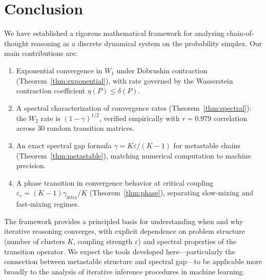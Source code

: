 \section{Conclusion}\label{sec:conclusion}

We have established a rigorous mathematical framework for analyzing
chain-of-thought reasoning as a discrete dynamical system on the probability
simplex. Our main contributions are:

\begin{enumerate}[label=(\arabic*)]
\item Exponential convergence in $W_1$ under Dobrushin contraction
  (Theorem~\ref{thm:exponential}), with rate governed by the Wasserstein
  contraction coefficient $\eta(P) \le \delta(P)$.

\item A spectral characterization of convergence rates
  (Theorem~\ref{thm:spectral}): the $W_2$ rate is $(1 - \gamma)^{1/2}$,
  verified empirically with $r = 0.979$ correlation across 30 random
  transition matrices.

\item An exact spectral gap formula $\gamma = K\varepsilon/(K-1)$ for
  metastable chains (Theorem~\ref{thm:metastable}), matching numerical
  computation to machine precision.

\item A phase transition in convergence behavior at critical coupling
  $\varepsilon_c = (K-1)\gamma_{\mathrm{intra}}/K$
  (Theorem~\ref{thm:phase}), separating slow-mixing and fast-mixing
  regimes.
\end{enumerate}

The framework provides a principled basis for understanding when and why
iterative reasoning converges, with explicit dependence on problem structure
(number of clusters $K$, coupling strength $\varepsilon$) and spectral
properties of the transition operator. We expect the tools developed
here---particularly the connection between metastable structure and spectral
gap---to be applicable more broadly to the analysis of iterative inference
procedures in machine learning.
